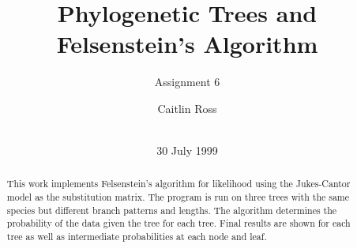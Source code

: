 \documentclass{acm_proc_article-sp}
\begin{document}
\title{Phylogenetic Trees and Felsenstein's Algorithm}
\subtitle{Assignment 6}
%
%
%
%
%

%
\author{
	\alignauthor Caitlin Ross\\
	 \\
}

\date{30 July 1999}

\maketitle

\begin{abstract}
This work implements Felsenstein's algorithm for likelihood using the Jukes-Cantor model as the substitution matrix.  The program is run on three trees with the same species but different branch patterns and lengths.  The algorithm determines the probability of the data given the tree for each tree.  Final results are shown for each tree as well as intermediate probabilities at each node and leaf.  
\end{abstract}
\end{document}
